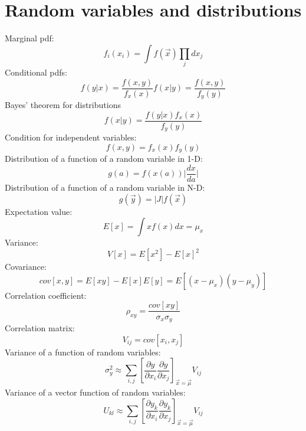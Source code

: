 \documentclass[12pt]{book}
\newcommand{\vx}{\vec{x}}
\begin{document}
\section{Random variables and distributions}
Marginal pdf:
\begin{equation}
	f_i(x_i) = \int f(\vx)\prod_j dx_j
\end{equation}
Conditional pdfs:
\begin{equation}
	f(y|x) = \frac{f(x,y)}{f_x(x)} f(x|y) = \frac{f(x,y)}{f_y(y)}
\end{equation}
Bayes' theorem for distributions
\begin{equation}
	f(x|y) = \frac{f(y|x)f_x(x)}{f_y(y)}
\end{equation}
Condition for independent variables:
\begin{equation}
	f(x,y) = f_x(x)f_y(y)
\end{equation}
Distribution of a function of a random variable in 1-D:
\begin{equation}
	g(a) = f(x(a))\vert\frac{dx}{da}\vert
\end{equation}
Distribution of a function of a random variable in N-D:
\begin{equation}
	g(\vec{y}) = |J|f(\vx)
\end{equation}
Expectation value:
\begin{equation}
	E[x] = \int xf(x)dx = \mu_x
\end{equation}
Variance:
\begin{equation}
	V[x] = E[x^2] - E[x]^2
\end{equation}
Covariance:
\begin{equation}
	cov[x,y] = E[xy] - E[x]E[y] = E[(x-\mu_x)(y-\mu_y)]
\end{equation}
Correlation coefficient:
\begin{equation}
	\rho_{xy} = \frac{cov[xy]}{\sigma_x\sigma_y}
\end{equation}
Correlation matrix:
\begin{equation}
	V_{ij} = cov[x_i,x_j]
\end{equation}
Variance of a function of random variables:
\begin{equation}
	\sigma^2_y \approx \sum_{i,j} \left[\frac{\partial y}{\partial x_i}\frac{\partial y}{\partial x_j}\right]_{\vx=\vec{\mu}} V_{ij}
\end{equation}
Variance of a vector function of random variables:
\begin{equation}
	U_{kl} \approx \sum_{i,j} \left[\frac{\partial y_k}{\partial x_i}\frac{\partial y_k}{\partial x_j}\right]_{\vx = \vec{\mu}} V_{ij}
\end{equation}
\end{document}
